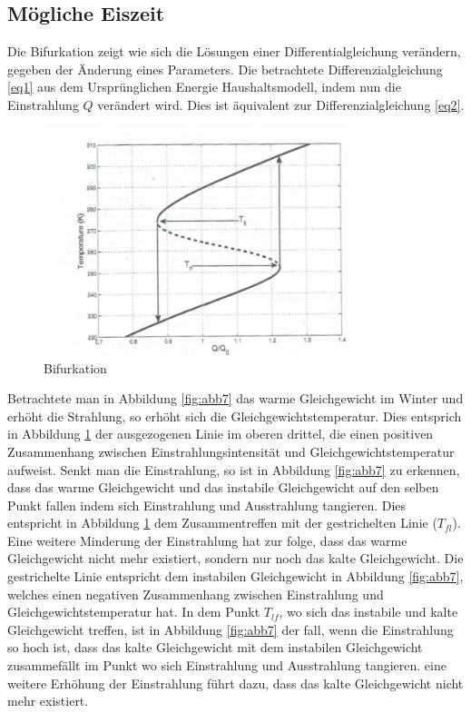 \begin{refsection}
\subsection{Mögliche Eiszeit} \label{sec:bi} 
Die Bifurkation zeigt wie sich die Lösungen einer Differentialgleichung verändern, gegeben der Änderung eines Parameters. Die betrachtete Differenzialgleichung \eqref{eq1} aus dem Ursprünglichen Energie Haushaltsmodell, indem nun die Einstrahlung $Q$ verändert wird. Dies ist äquivalent zur Differenzialgleichung \eqref{eq2}.
%
\begin{figure}
	\centering
	\includegraphics[width= 0.8\textwidth]{neigung/Bifurkation.png}
	\caption[Bifurkation]{Bifurkation}
	\label{fig:abb8}
\end{figure}
%
Betrachtete man in Abbildung \ref{fig:abb7} das warme Gleichgewicht im Winter und erhöht die Strahlung, so erhöht sich die Gleichgewichtstemperatur. Dies entsprich in Abbildung \ref{fig:abb8} der ausgezogenen Linie im oberen drittel, die einen positiven Zusammenhang zwischen Einstrahlungsintensität und Gleichgewichtstemperatur aufweist. Senkt man die Einstrahlung, so ist in Abbildung \ref{fig:abb7} zu erkennen, dass das warme Gleichgewicht und das instabile Gleichgewicht auf den selben Punkt fallen indem sich Einstrahlung und Ausstrahlung tangieren. Dies entspricht in Abbildung \ref{fig:abb8} dem Zusammentreffen mit der gestrichelten Linie ($T_{fl}$). Eine weitere Minderung der Einstrahlung hat zur folge, dass das warme Gleichgewicht nicht mehr existiert, sondern nur noch das kalte Gleichgewicht.
Die gestrichelte Linie entspricht dem instabilen Gleichgewicht in Abbildung \ref{fig:abb7}, welches einen negativen Zusammenhang zwischen Einstrahlung und Gleichgewichtstemperatur hat. In dem Punkt $T_{lf}$, wo sich das instabile und kalte Gleichgewicht treffen, ist in Abbildung \ref{fig:abb7} der fall, wenn die Einstrahlung so hoch ist, dass das kalte Gleichgewicht mit dem instabilen Gleichgewicht zusammefällt im Punkt wo sich Einstrahlung und Ausstrahlung tangieren. eine weitere Erhöhung der Einstrahlung führt dazu, dass das kalte Gleichgewicht nicht mehr existiert.

\end{refsection}
